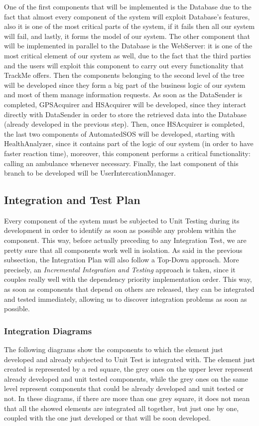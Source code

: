 \noindent
One of the first components that will be implemented is the Database due to the fact that almost every component of the system will exploit Database's features, also it is one of the most critical parts of the system, if it fails then all our system will fail, and lastly, it forms the model of our system.
\medbreak
\noindent
The other component that will be implemented in parallel to the Database is the WebServer: it is one of the most critical element of our system as well, due to the fact that the third parties and the users will exploit this component to carry out every functionality that TrackMe offers.
\medbreak
\noindent
Then the components belonging to the second level of the tree will be developed since they form a big part of the business logic of our system and most of them manage information requests.
\medbreak
\noindent
As soon as the DataSender is completed, GPSAcquirer and HSAcquirer will be developed, since they interact directly with DataSender in order to store the retrieved data into the Database (already developed in the previous step). Then, once HSAcquirer is completed, the last two components of AutomatedSOS will be developed, starting with HealthAnalyzer, since it contains part of the logic of our system (in order to have faster reaction time), moreover, this component performs a critical functionality: calling an ambulance whenever necessary. Finally, the last component of this branch to be developed will be UserIntercationManager.

\subsection{Integration and Test Plan}
Every component of the system must be subjected to Unit Testing during its development in order to identify as soon as possible any problem within the component. This way, before actually preceding to any Integration Test, we are pretty sure that all components work well in isolation.
\medbreak
\noindent
As said in the previous subsection, the Integration Plan will also follow a Top-Down approach. More precisely, an \textit{Incremental Integration and Testing} approach is taken, since it couples really well with the dependency priority implementation order. This way, as soon as components that depend on others are released, they can be integrated and tested immediately, allowing us to discover integration problems as soon as possible.

\subsubsection{Integration Diagrams}
The following diagrams show the components to which the element just developed and already subjected to Unit Test is integrated with. The element just created is represented by a red square, the grey ones on the upper lever represent already developed and unit tested components, while the grey ones on the same level represent components that could be already developed and unit tested or not. In these diagrams, if there are more than one grey square, it does not mean that all the showed elements are integrated all together, but just one by one, coupled with the one just developed or that will be soon developed.

